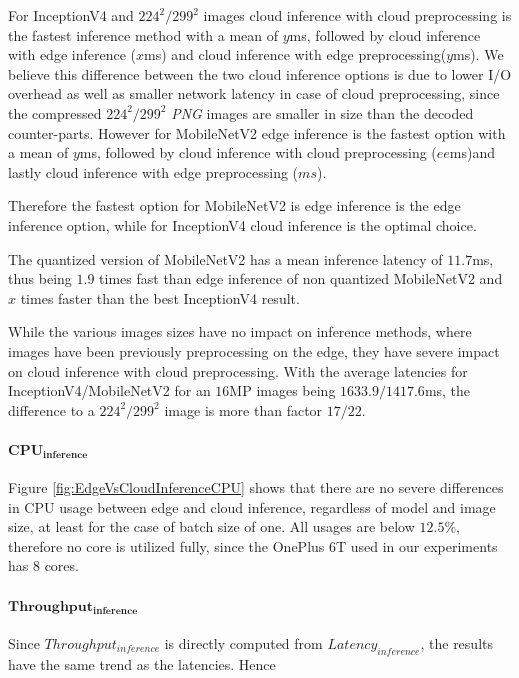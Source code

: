 For InceptionV4 and $224^2/299^2$ images cloud inference with cloud preprocessing is the fastest inference method with a mean of $y$ms, followed by cloud inference with edge inference ($x$ms) and cloud inference with edge preprocessing($y$ms).
We believe this difference between the two cloud inference options is due to lower I/O overhead as well as smaller network latency in case of cloud preprocessing, since the compressed $224^2/299^2$ \emph{PNG} images are smaller in size than the decoded counter-parts. 
However for MobileNetV2 edge inference is the fastest option with a mean of $y$ms, followed by cloud inference with cloud preprocessing ($ee$ms)and lastly cloud inference with edge preprocessing ($ms$).

Therefore the fastest option for MobileNetV2 is edge inference is the edge inference option, while for InceptionV4 cloud inference is the optimal choice.

The quantized version of MobileNetV2 has a mean inference latency of $11.7$ms, thus being $1.9$ times fast than edge inference of non quantized MobileNetV2 and $x$ times faster than the best InceptionV4 result.

While the various images sizes have no impact on inference methods, where images have been previously preprocessing on the edge, they have severe impact on cloud inference with cloud preprocessing.
With the average latencies for InceptionV4/MobileNetV2 for an $16$MP images being $1633.9/1417.6$ms, the difference to a $224^2/299^2$ image is more than factor $17/22$.

\paragraph{$\mathbf{CPU_{inference}}$}
Figure \ref{fig:EdgeVsCloudInferenceCPU} shows that there are no severe differences in CPU usage between edge and cloud inference, regardless of model and image size, at least for the case of batch size of one.
All usages are below $12.5\%$, therefore no core is utilized fully, since the OnePlus 6T used in our experiments has $8$ cores.
\paragraph{$\mathbf{Throughput_{inference}}$}
Since $Throughput_{inference}$ is directly computed from $Latency_{inference}$, the results have the same trend as the latencies.
Hence
